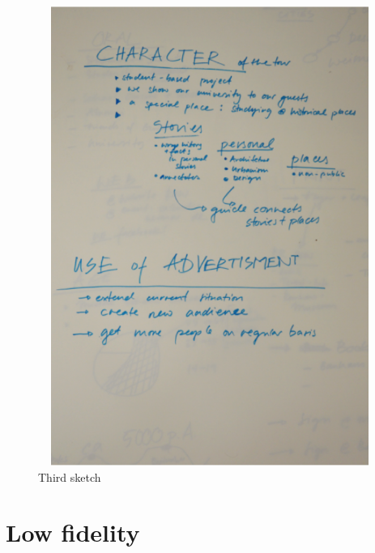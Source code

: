 \begin{figure}[H]
    \centering
    \includegraphics[width=12cm,height=15cm]{Appendices/4/sk3}%
    \caption{Third sketch}%
    \label{fig:Sk3}%
\end{figure}


\chapter {Low fidelity}
\label{AppendixC} 
\setcounter{figure}{0}










